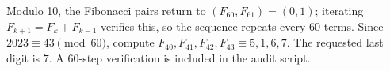 Modulo 10, the Fibonacci pairs return to $(F_{60},F_{61})=(0,1)$; iterating $F_{k+1}=F_k+F_{k-1}$ verifies this, so the sequence repeats every 60 terms. Since $2023\equiv43\pmod{60}$, compute $F_{40},F_{41},F_{42},F_{43}\equiv5,1,6,7$. The requested last digit is $\boxed7$. A 60-step verification is included in the audit script.

